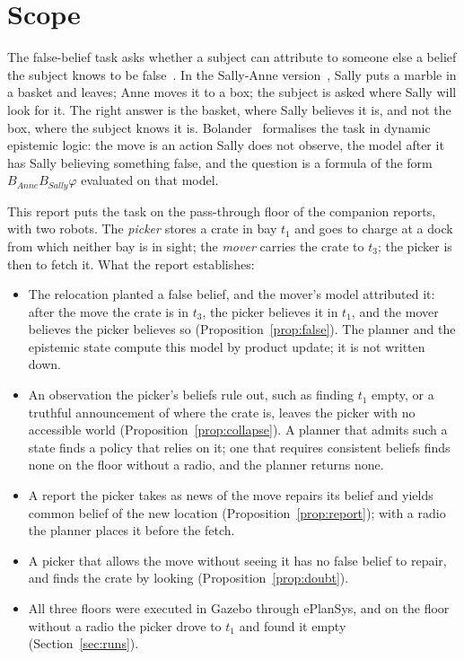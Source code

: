 \documentclass[11pt,a4paper]{article}
\theoremstyle{definition}
\newcommand{\Bop}[1]{B_{#1}}
\begin{document}
\tableofcontents
\newpage

\section{Scope}
\label{sec:scope}

The false-belief task asks whether a subject can attribute to someone else a
belief the subject knows to be false~\cite{wimmer1983}. In the Sally-Anne
version~\cite{baroncohen1985}, Sally puts a marble in a basket and leaves; Anne
moves it to a box; the subject is asked where Sally will look for it. The right
answer is the basket, where Sally believes it is, and not the box, where the
subject knows it is. Bolander~\cite{bolander2018} formalises the task in
dynamic epistemic logic: the move is an action Sally does not observe, the
model after it has Sally believing something false, and the question is a
formula of the form $\Bop{\mathit{Anne}}\Bop{\mathit{Sally}}\varphi$ evaluated on
that model.

This report puts the task on the pass-through floor of the companion reports,
with two robots. The \emph{picker} stores a crate in bay $t_1$ and goes to
charge at a dock from which neither bay is in sight; the \emph{mover} carries
the crate to $t_3$; the picker is then to fetch it. What the report establishes:

\begin{itemize}[leftmargin=1.4em, itemsep=2pt]
  \item The relocation planted a false belief, and the mover's model
    attributed it: after the move the crate is in $t_3$, the picker believes it
    in $t_1$, and the mover believes the picker believes so
    (Proposition~\ref{prop:false}). The planner and the epistemic state compute
    this model by product update; it is not written down.
  \item An observation the picker's beliefs rule out, such as finding $t_1$
    empty, or a truthful announcement of where the crate is, leaves the picker
    with no accessible world (Proposition~\ref{prop:collapse}). A planner
    that admits such a state finds a policy that relies on it; one that
    requires consistent beliefs finds none on the floor without a radio, and
    the planner returns none.
  \item A report the picker takes as news of the move repairs its belief and
    yields common belief of the new location (Proposition~\ref{prop:report});
    with a radio the planner places it before the fetch.
  \item A picker that allows the move without seeing it has no false belief to
    repair, and finds the crate by looking (Proposition~\ref{prop:doubt}).
  \item All three floors were executed in Gazebo through ePlanSys, and on the
    floor without a radio the picker drove to $t_1$ and found it empty
    (Section~\ref{sec:runs}).
\end{itemize}
\end{document}
